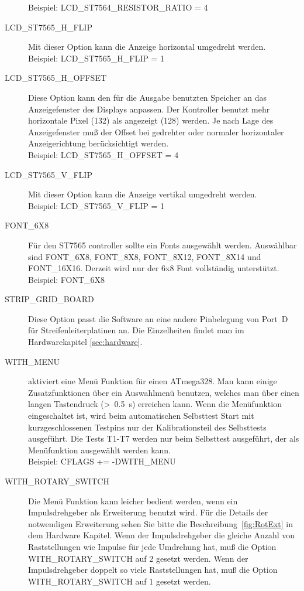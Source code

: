 \begin{description}
Beispiel: LCD\_ST7564\_RESISTOR\_RATIO = 4
  \item[LCD\_ST7565\_H\_FLIP] Mit dieser Option kann die Anzeige horizontal umgedreht werden.\\
Beispiel: LCD\_ST7565\_H\_FLIP = 1
  \item[LCD\_ST7565\_H\_OFFSET] Diese Option kann den für die Ausgabe benutzten Speicher an das Anzeigefenster des
 Displays anpassen. Der Kontroller benutzt mehr horizontale Pixel (132) als angezeigt (128) werden.
 Je nach Lage des Anzeigefenster muß der Offset bei gedrehter oder normaler horizontaler Anzeigerichtung
 berücksichtigt werden.\\
Beispiel: LCD\_ST7565\_H\_OFFSET = 4
  \item[LCD\_ST7565\_V\_FLIP] Mit dieser Option kann die Anzeige vertikal umgedreht werden.\\
Beispiel: LCD\_ST7565\_V\_FLIP = 1
  \item[FONT\_6X8] Für den ST7565 controller sollte ein Fonts ausgewählt werden.
Auswählbar  sind FONT\_6X8, FONT\_8X8, FONT\_8X12, FONT\_8X14 und FONT\_16X16.
Derzeit wird nur der 6x8 Font vollständig unterstützt.\\
Beispiel: FONT\_6X8
  \item[STRIP\_GRID\_BOARD] Diese Option passt die Software an eine andere Pinbelegung von Port~D für Streifenleiterplatinen an.
Die Einzelheiten findet man im Hardwarekapitel \ref{sec:hardware}.
  \item[WITH\_MENU] aktiviert eine Menü Funktion für einen ATmega328.  Man kann einige Zusatzfunktionen über ein
Auswahlmenü benutzen, welches man über einen langen Tastendruck (\textgreater~0.5~s) erreichen kann.
Wenn die Menüfunktion eingeschaltet ist, wird beim automatischen Selbsttest Start mit kurzgeschlossenen Testpins
 nur der Kalibrationsteil des Selbsttests ausgeführt.
Die Tests T1-T7 werden nur beim Selbsttest ausgeführt, der als Menüfunktion ausgewählt werden kann.\\
Beispiel: CFLAGS += -DWITH\_MENU
  \item[WITH\_ROTARY\_SWITCH] Die Menü Funktion kann leicher bedient werden, wenn ein Impulsdrehgeber als Erweiterung
benutzt wird.
Für die Details der notwendigen Erweiterung sehen Sie bitte die Beschreibung~\ref{fig:RotExt} in dem Hardware Kapitel.
Wenn der Impulsdrehgeber die gleiche Anzahl von Raststellungen wie Impulse für jede Umdrehung hat,
muß die Option WITH\_ROTARY\_SWITCH auf 2 gesetzt werden.
Wenn der Impulsdrehgeber doppelt so viele Raststellungen hat, muß die Option WITH\_ROTARY\_SWITCH auf 1 gesetzt werden.

\end{description}
